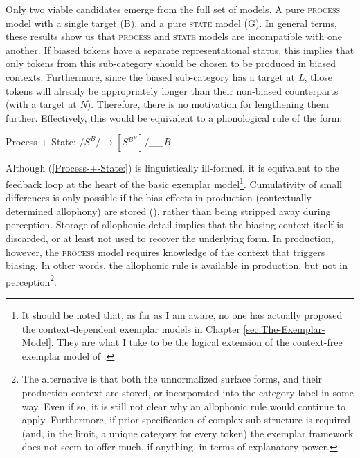 \begin{table}[h]
\caption{2-Level Model Space\label{tab: Model Comparison}}
%
\end{table}

Only two viable candidates emerge from the full set of models. A pure
\textsc{process} model with a single target (B), and a pure \textsc{state}
model (G). In general terms, these results show us that \textsc{process}
and \textsc{state} models are incompatible with one another. If biased
tokens have a separate representational status, this implies that
only tokens from this sub-category should be chosen to be produced
in biased contexts. Furthermore, since the biased sub-category has
a target at \emph{L}, those tokens will already be appropriately longer
than their non-biased counterparts (with a target at \emph{N}). Therefore,
there is no motivation for lengthening them further. Effectively,
this would be equivalent to a phonological rule of the form:
\begin{covexamples}
\item \label{Process-+-State:}Process + State: $/S^{B}/\rightarrow[S{}^{B^{B}}]/$\emph{\_\_B}
\end{covexamples}
Although (\ref{Process-+-State:}) is linguistically ill-formed, it
is equivalent to the feedback loop at the heart of the basic exemplar
model\footnote{It should be noted that, as far as I am aware, no one has actually
proposed the context-dependent exemplar models in Chapter \ref{sec:The-Exemplar-Model}.
They are what I take to be the logical extension of the context-free
exemplar model of \citet{Pierrehumbert2000}.}. Cumulativity of small differences is only possible if the bias effects
in production (contextually determined allophony) are stored (),
rather than being stripped away during perception. Storage of allophonic
detail implies that the biasing context itself is discarded, or at
least not used to recover the underlying form. In production, however,
the \textsc{process} model requires knowledge of the context that
triggers biasing. In other words, the allophonic rule is available
in production, but not in perception\footnote{The alternative is that both the unnormalized surface forms, and their
production context are stored, or incorporated into the category label
in some way. Even if so, it is still not clear why an allophonic rule
would continue to apply. Furthermore, if prior specification of complex
sub-structure is required (and, in the limit, a unique category for
every token) the exemplar framework does not seem to offer much, if
anything, in terms of explanatory power. }. 

